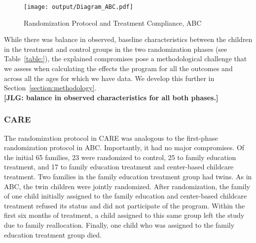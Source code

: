 \begin{center}
	\begin{figure}[H]
		\caption{Randomization Protocol and Treatment Compliance, ABC} \label{fig:abc-flow}
		\centering
		\texttt{[image: output/Diagram\_ABC.pdf]}
	\end{figure}
\end{center}

\noindent While there was balance in observed, baseline characteristics between the children in the treatment and control groups in the two randomization phases (see Table~\ref{table:}), the explained compromises pose a methodological challenge that we assess when calculating the effects the program for all the outcomes and across all the ages for which we have data. We develop this further in Section~\ref{section:methodology}.\\

\noindent \textbf{[JLG: balance in observed characteristics for all both phases.]}\\

\subsubsection{CARE}

\noindent The randomization protocol in CARE was analogous to the first-phase randomization protocol in ABC. Importantly, it had no major compromises. Of the initial 65 families, 23 were randomized to control, 25 to family education treatment, and 17 to family education treatment and center-based childcare treatment. Two families in the family education treatment group had twins. As in ABC, the twin children were jointly randomized. After randomization, the family of one child initially assigned to the family education and center-based childcare treatment refused its status and did not participate of the program. Within the first six months of treatment, a child assigned to this same group left the study due to family reallocation. Finally, one child who was assigned to the family education treatment group died.\\

